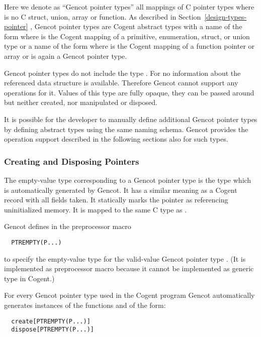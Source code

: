 Here we denote as ``Gencot pointer types'' all mappings of C pointer types  where  is no C struct, union, array or function.
As described in Section~\ref{design-types-pointer} , Gencot pointer types are 
Cogent abstract types with a name of the form  where  is the Cogent mapping of a primitive, enumeration, struct, or union 
type  or a name of the form  where  is the Cogent mapping of a function pointer or array or  is again a 
Gencot pointer type.

Gencot pointer types do not include the type . For  no information about the referenced data structure is available. 
Therefore Gencot cannot support any operations 
for it. Values of this type are fully opaque, they can be passed around but neither created, nor manipulated or disposed. 

It is possible for the developer to manually define additional Gencot pointer types by defining abstract types using the same naming schema.
Gencot provides the operation support described in the following sections also for such types.

\subsubsection{Creating and Disposing Pointers}

The empty-value type corresponding to a Gencot pointer type  is the type  which
is automatically generated by Gencot. It has a similar meaning as a Cogent
record with all fields taken. It statically marks the pointer as referencing uninitialized memory. It is mapped to the same C 
type as .

Gencot defines in  the preprocessor macro 
\begin{verbatim}
  PTREMPTY(P...)
\end{verbatim}
to specify the empty-value type for the valid-value Gencot pointer type . (It is implemented 
as preprocessor macro because it cannot be implemented as generic type in Cogent.)

For every Gencot pointer type  used in the Cogent program Gencot automatically
generates instances of the functions  and  of the form:
\begin{verbatim}
  create[PTREMPTY(P...)]
  dispose[PTREMPTY(P...)]
\end{verbatim}

